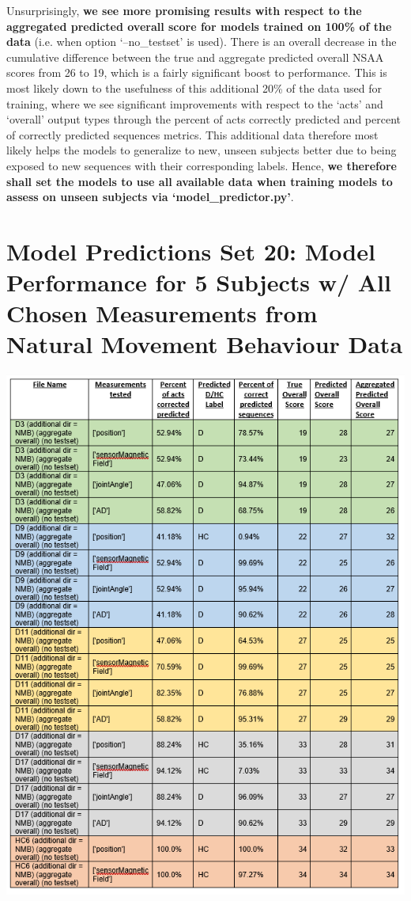 \documentclass[12pt,twoside]{report}
\begin{document}
\quad Unsurprisingly, \textbf{we see more promising results with respect to the aggregated predicted overall score for models trained on 100\% of the data} (i.e. when option ‘--no\_testset’ is used). There is an overall decrease in the cumulative difference between the true and aggregate predicted overall NSAA scores from 26 to 19, which is a fairly significant boost to performance. This is most likely down to the usefulness of this additional 20\% of the data used for training, where we see significant improvements with respect to the ‘acts’ and ‘overall’ output types through the percent of acts correctly predicted and percent of correctly predicted sequences metrics. This additional data therefore most likely helps the models to generalize to new, unseen subjects better due to being exposed to new sequences with their corresponding labels. Hence, \textbf{we therefore shall set the models to use all available data when training models to assess on unseen subjects via ‘model\_predictor.py’}.\\




\section{Model Predictions Set 20: Model Performance for 5 Subjects w/ All Chosen Measurements from Natural Movement Behaviour Data}

\begin{center}
\includegraphics[scale=0.8]{project_figures/fig11_27}
\end{center}
\end{document}
